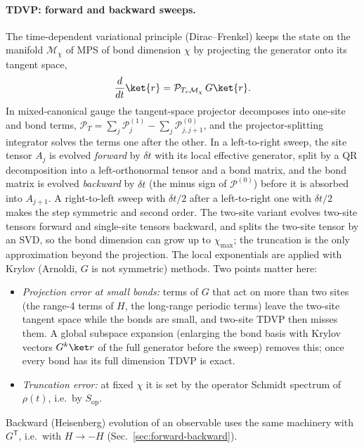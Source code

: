 \paragraph{TDVP: forward and backward sweeps.} The time-dependent variational principle (Dirac--Frenkel) keeps the state on the manifold $\mathcal M_\chi$ of MPS of bond dimension $\chi$ by projecting the generator onto its tangent space,
\begin{equation}
\frac{d}{dt}\ket{r} = \mathcal P_{T_r\mathcal M_\chi}\,G\ket{r}.
\end{equation}
In mixed-canonical gauge the tangent-space projector decomposes into one-site and bond terms, $\mathcal P_T = \sum_{j}\mathcal P^{(1)}_j - \sum_{j}\mathcal P^{(0)}_{j,j+1}$, and the projector-splitting integrator solves the terms one after the other. In a left-to-right sweep, the site tensor $A_j$ is evolved \emph{forward} by $\delta t$ with its local effective generator, split by a QR decomposition into a left-orthonormal tensor and a bond matrix, and the bond matrix is evolved \emph{backward} by $\delta t$ (the minus sign of $\mathcal P^{(0)}$) before it is absorbed into $A_{j+1}$. A right-to-left sweep with $\delta t/2$ after a left-to-right one with $\delta t/2$ makes the step symmetric and second order. The two-site variant evolves two-site tensors forward and single-site tensors backward, and splits the two-site tensor by an SVD, so the bond dimension can grow up to $\chi_{\max}$; the truncation is the only approximation beyond the projection. The local exponentials are applied with Krylov (Arnoldi, $G$ is not symmetric) methods. Two points matter here:
\begin{itemize}
\item \emph{Projection error at small bonds:} terms of $G$ that act on more than two sites (the range-4 terms of $H$, the long-range periodic terms) leave the two-site tangent space while the bonds are small, and two-site TDVP then misses them. A global subspace expansion (enlarging the bond basis with Krylov vectors $G^k\ket r$ of the full generator before the sweep) removes this; once every bond has its full dimension TDVP is exact.
\item \emph{Truncation error:} at fixed $\chi$ it is set by the operator Schmidt spectrum of $\rho(t)$, i.e.\ by $S_{\mathrm{op}}$.
\end{itemize}
Backward (Heisenberg) evolution of an observable uses the same machinery with $G^{\mathsf T}$, i.e.\ with $H \to -H$ (Sec.~\ref{sec:forward-backward}).

